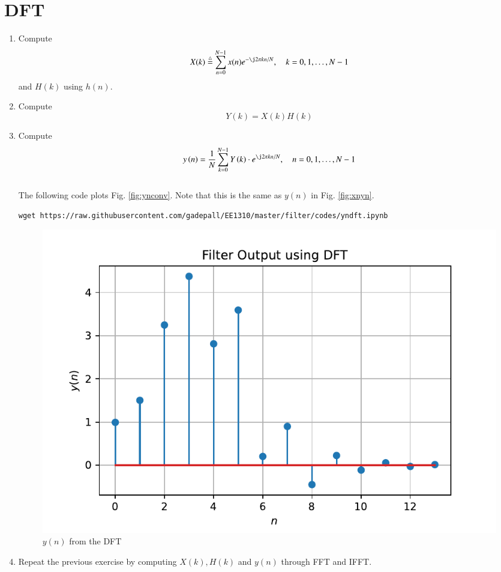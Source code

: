 \documentclass[journal,12pt,twocolumn]{IEEEtran}
\renewcommand\thesection{\arabic{section}}
\begin{document}
\section{DFT}
\begin{enumerate}[label=\thesection.\arabic*]
\item
Compute
\begin{equation}
X(k) \define \sum _{n=0}^{N-1}x(n) e^{-\j2\pi kn/N}, \quad k = 0,1,\dots, N-1
\end{equation}
and $H(k)$ using $h(n)$.
\item Compute 
\begin{equation}
Y(k) = X(k)H(k)
\end{equation}
\item Compute
\begin{equation}
 y\brak{n}={\frac {1}{N}}\sum _{k=0}^{N-1}Y\brak{k}\cdot e^{\j 2\pi kn/N},\quad n = 0,1,\dots, N-1
\end{equation}
\\
\solution The following code plots Fig. \ref{fig:ynconv}. Note that this is the same as 
$y(n)$ in  Fig. 
\ref{fig:xnyn}. 
%
\begin{lstlisting}
wget https://raw.githubusercontent.com/gadepall/EE1310/master/filter/codes/yndft.ipynb
\end{lstlisting}
\begin{figure}[!ht]
\centering
\includegraphics[width=\columnwidth]{./figs/yndft}
\caption{$y(n)$ from the DFT}
\label{fig:yndft}
\end{figure}
\item Repeat the previous exercise by computing $X(k), H(k)$ and $y(n)$ through FFT and 
IFFT.

\end{enumerate}
%
\end{document}
